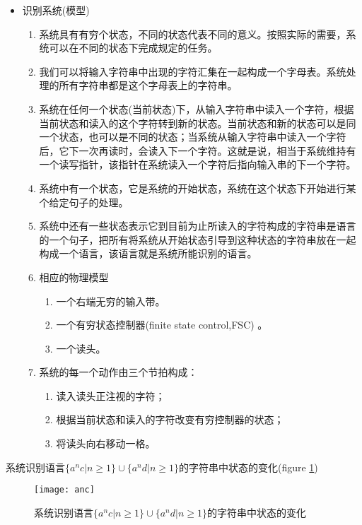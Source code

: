 \begin{itemize}
	\item 识别系统(模型)
	\begin{enumerate}
		\item 系统具有有穷个状态，不同的状态代表不同的意义。按照实际的需要，系统可以在不同的状态下完成规定的任务。
		\item 我们可以将输入字符串中出现的字符汇集在一起构成一个字母表。系统处理的所有字符串都是这个字母表上的字符串。 
		\item 系统在任何一个状态(当前状态)下，从输入字符串中读入一个字符，根据当前状态和读入的这个字符转到新的状态。当前状态和新的状态可以是同一个状态，也可以是不同的状态；当系统从输入字符串中读入一个字符后，它下一次再读时，会读入下一个字符。这就是说，相当于系统维持有一个读写指针，该指针在系统读入一个字符后指向输入串的下一个字符。
		\item 系统中有一个状态，它是系统的开始状态，系统在这个状态下开始进行某个给定句子的处理。 
		\item 系统中还有一些状态表示它到目前为止所读入的字符构成的字符串是语言的一个句子，把所有将系统从开始状态引导到这种状态的字符串放在一起构成一个语言，该语言就是系统所能识别的语言。\item 相应的物理模型
		\begin{enumerate}
			\item 一个右端无穷的输入带。
			\item 一个有穷状态控制器(finite state control,FSC) 。
			\item 一个读头。
		\end{enumerate}
	   \item 系统的每一个动作由三个节拍构成：
	   \begin{enumerate}
	   		\item 读入读头正注视的字符；
	   		\item 根据当前状态和读入的字符改变有穷控制器的状态；
	   		\item 将读头向右移动一格。
	   \end{enumerate}    	
	\end{enumerate}
\end{itemize}

系统识别语言$\{a^nc|n\ge 1\}\cup\{a^nd|n\ge 1\}$的字符串中状态的变化(figure \ref{fig:anc})
\begin{figure}[htbp]
	\texttt{[image: anc]}
	\caption{系统识别语言$\{a^nc|n\ge 1\}\cup\{a^nd|n\ge 1\}$的字符串中状态的变化}
	\label{fig:anc}       %
\end{figure}

